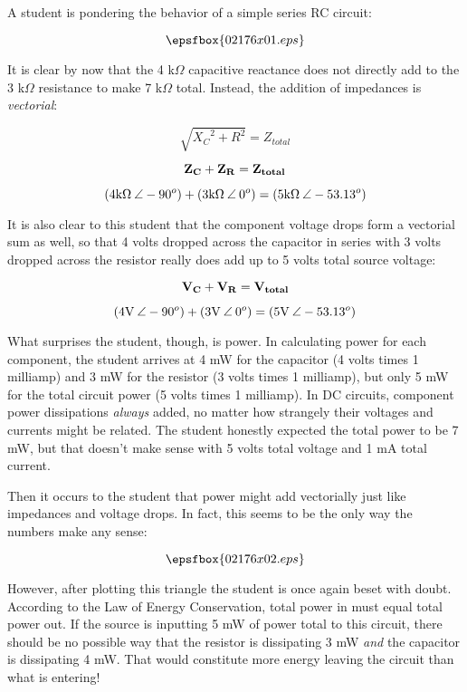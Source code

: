 

A student is pondering the behavior of a simple series RC circuit:

$$\epsfbox{02176x01.eps}$$

It is clear by now that the 4 k$\Omega$ capacitive reactance does not directly add to the 3 k$\Omega$ resistance to make 7 k$\Omega$ total.  Instead, the addition of impedances is {\it vectorial}: 

$$\sqrt{{X_C}^2 + R^2}= Z_{total}$$

$${\bf Z_C} + {\bf Z_R} = {\bf Z_{total}}$$

$$(4 \hbox{k}\Omega \> \angle -90^o) + (3 \hbox{k}\Omega \> \angle \> 0^o) = (5 \hbox{k}\Omega \> \angle -53.13^o)$$

It is also clear to this student that the component voltage drops form a vectorial sum as well, so that 4 volts dropped across the capacitor in series with 3 volts dropped across the resistor really does add up to 5 volts total source voltage:

$${\bf V_C} + {\bf V_R} = {\bf V_{total}}$$

$$(4 \hbox{V} \> \angle -90^o) + (3 \hbox{V} \> \angle \> 0^o) = (5 \hbox{V} \> \angle -53.13^o)$$

What surprises the student, though, is power.  In calculating power for each component, the student arrives at 4 mW for the capacitor (4 volts times 1 milliamp) and 3 mW for the resistor (3 volts times 1 milliamp), but only 5 mW for the total circuit power (5 volts times 1 milliamp).  In DC circuits, component power dissipations {\it always} added, no matter how strangely their voltages and currents might be related.  The student honestly expected the total power to be 7 mW, but that doesn't make sense with 5 volts total voltage and 1 mA total current.

Then it occurs to the student that power might add vectorially just like impedances and voltage drops.  In fact, this seems to be the only way the numbers make any sense:

$$\epsfbox{02176x02.eps}$$

However, after plotting this triangle the student is once again beset with doubt.  According to the Law of Energy Conservation, total power in must equal total power out.  If the source is inputting 5 mW of power total to this circuit, there should be no possible way that the resistor is dissipating 3 mW {\it and} the capacitor is dissipating 4 mW.  That would constitute more energy leaving the circuit than what is entering!

